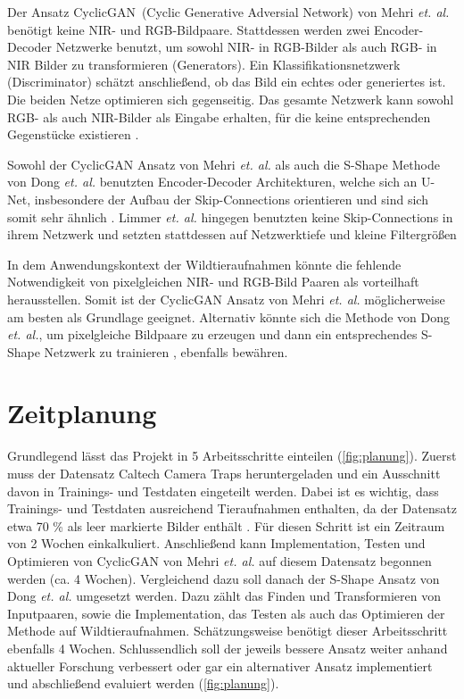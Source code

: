 \documentclass[runningheads]{llncs}
\begin{document}
Der Ansatz \glqq CyclicGAN\grqq \ (Cyclic Generative Adversial Network) von Mehri \textit{et. al.} benötigt keine NIR- und RGB-Bildpaare.
Stattdessen werden zwei Encoder-Decoder Netzwerke benutzt, um sowohl NIR- in RGB-Bilder als auch RGB- in NIR Bilder zu transformieren (Generators).
Ein Klassifikationsnetzwerk (Discriminator) schätzt anschließend, ob das Bild ein echtes oder generiertes ist. Die beiden Netze optimieren sich gegenseitig.
Das gesamte Netzwerk kann sowohl RGB- als auch NIR-Bilder als Eingabe erhalten, für die keine entsprechenden Gegenstücke existieren \cite{mehri2019colorizing}.

Sowohl der CyclicGAN Ansatz von Mehri \textit{et. al.} als auch die S-Shape Methode von Dong \textit{et. al.} benutzten Encoder-Decoder Architekturen, 
welche sich an U-Net, insbesondere der Aufbau der Skip-Connections \cite{unet} orientieren und sind sich somit sehr ähnlich \cite{dong2018infrared,mehri2019colorizing}. 
Limmer \textit{et. al.} hingegen benutzten keine Skip-Connections in ihrem Netzwerk und setzten stattdessen auf Netzwerktiefe und kleine Filtergrößen \cite{limmer2016infrared} 

In dem Anwendungskontext der Wildtieraufnahmen könnte die fehlende Notwendigkeit von pixelgleichen NIR- und RGB-Bild Paaren als vorteilhaft herausstellen.
Somit ist der CyclicGAN Ansatz von Mehri \textit{et. al.} \cite*{mehri2019colorizing} möglicherweise am besten als Grundlage geeignet. 
Alternativ könnte sich die Methode von Dong \textit{et. al.}, um pixelgleiche Bildpaare zu erzeugen und dann ein entsprechendes S-Shape Netzwerk zu trainieren \cite*{dong2018infrared}, ebenfalls bewähren.  

\section{Zeitplanung}

Grundlegend lässt das Projekt in 5 Arbeitsschritte einteilen (\autoref{fig:planung}). Zuerst muss der Datensatz Caltech Camera Traps heruntergeladen und ein Ausschnitt davon in Trainings- und Testdaten eingeteilt werden. 
Dabei ist es wichtig, dass Trainings- und Testdaten ausreichend Tieraufnahmen enthalten, da der Datensatz etwa 70 \% als leer markierte Bilder enthält \cite{caltech}. Für diesen Schritt ist ein Zeitraum von 2 Wochen einkalkuliert. 
Anschließend kann Implementation, Testen und Optimieren von CyclicGAN von Mehri \textit{et. al.} \cite*{mehri2019colorizing} auf diesem Datensatz begonnen werden (ca. 4 Wochen). 
Vergleichend dazu soll danach der S-Shape Ansatz von Dong \textit{et. al.} \cite*{dong2018infrared} umgesetzt werden. 
Dazu zählt das Finden und Transformieren von Inputpaaren, sowie die Implementation, das Testen als auch das Optimieren der Methode auf Wildtieraufnahmen. Schätzungsweise benötigt dieser Arbeitsschritt ebenfalls 4 Wochen. 
Schlussendlich soll der jeweils bessere Ansatz weiter anhand aktueller Forschung verbessert oder gar ein alternativer Ansatz implementiert und abschließend evaluiert werden (\autoref{fig:planung}).  
\end{document}
